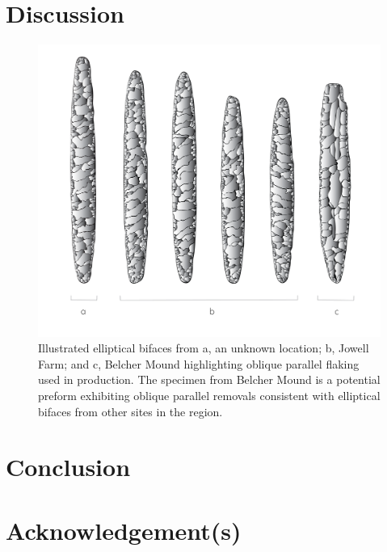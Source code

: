 \documentclass[]{interact}
\theoremstyle{plain}%
\theoremstyle{definition}
\theoremstyle{remark}
\begin{document}
\hypertarget{discussion}{%
\section{Discussion}\label{discussion}}

\begin{figure}\centering
\includegraphics[width=\linewidth]{figs/elliptical.illustration.png}
\caption{Illustrated elliptical bifaces from a, an unknown location; b, Jowell Farm; and c, Belcher Mound highlighting oblique parallel flaking used in production. The specimen from Belcher Mound is a potential preform exhibiting oblique parallel removals consistent with elliptical bifaces from other sites in the region.}
\label{fig:illustration}
\end{figure}

\hypertarget{conclusion}{%
\section{Conclusion}\label{conclusion}}

\hypertarget{acknowledgements}{%
\section*{Acknowledgement(s)}\label{acknowledgements}}
\end{document}
